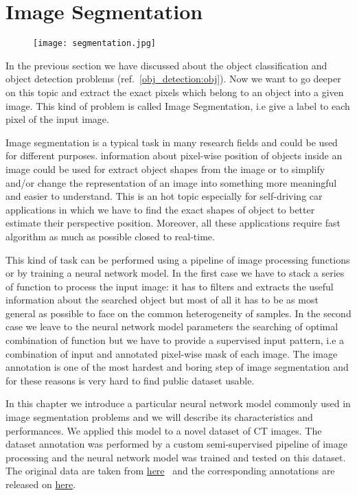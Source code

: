 \documentclass{standalone}
\begin{document}
\section[Segmentation]{Image Segmentation}\label{segmentation:unet}

\begin{center}
\begin{figure}[htbp]
\centering
\texttt{[image: segmentation.jpg]}
\label{fig:segmentation}
\end{figure}
\end{center}

In the previous section we have discussed about the object classification and object detection problems (ref.~\ref{obj_detection:obj}).
Now we want to go deeper on this topic and extract the exact pixels which belong to an object into a given image.
This kind of problem is called Image Segmentation, i.e give a label to each pixel of the input image.

Image segmentation is a typical task in many research fields and could be used for different purposes.
information about pixel-wise position of objects inside an image could be used for extract object shapes from the image or to simplify and/or change the representation of an image into something more meaningful and easier to understand.
This is an hot topic especially for self-driving car applications in which we have to find the exact shapes of object to better estimate their perspective position.
Moreover, all these applications require fast algorithm as much as possible closed to real-time.

This kind of task can be performed using a pipeline of image processing functions or by training a neural network model.
In the first case we have to stack a series of function to process the input image: it has to filters and extracts the useful information about the searched object but most of all it has to be as most general as possible to face on the common heterogeneity of samples.
In the second case we leave to the neural network model parameters the searching of optimal combination of function but we have to provide a supervised input pattern, i.e a combination of input and annotated pixel-wise mask of each image.
The image annotation is one of the most hardest and boring step of image segmentation and for these reasons is very hard to find public dataset usable.

In this chapter we introduce a particular neural network model commonly used in image segmentation problems and we will describe its characteristics and performances.
We applied this model to a novel dataset of CT images.
The dataset annotation was performed by a custom semi-supervised pipeline of image processing and the neural network model was trained and tested on this dataset.
The original data are taken from \href{https://mrl.sci.utah.edu/software/normal-hip-image-data/}{here}~\cite{doi:10.1002/jor.22040} and the corresponding annotations are released on \href{}{here}. %
\end{document}
